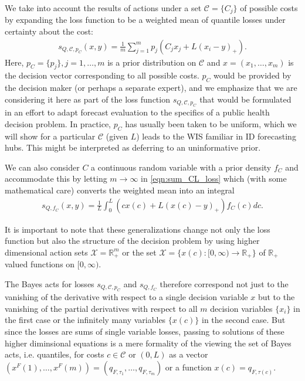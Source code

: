 \documentclass{article}
\begin{document}
We take into account the results of actions under a set $\mathcal{C} = \{C_j\}$ of possible costs by expanding the loss function to be a weighted mean of quantile losses under certainty about the cost:
\begin{align}
s_{Q,\mathcal{C}, p_C}(x,y) = \frac{1}{m}\sum_{j=1}^{m}p_j(C_j x_j + L(x_i - y)_+). \label{eqn:sum_CL_loss}
\end{align}
Here, $p_C = \{p_j\}, j = 1,\ldots,m$ is a prior distribution on $\mathcal{C}$ and $x = (x_1,\ldots,x_m)$ is the decision vector corresponding to all possible costs.  $p_C$ would be provided by the decision maker (or perhaps a separate expert), and we emphasize that we are considering it here as part of the loss function $s_{Q,\mathcal{C}, p_C}$ that would be formulated in an effort to adapt forecast evaluation to the specifics of a public health decision problem. In practice, $p_C$ has usually been taken to be uniform, which we will show for a particular $\mathcal{C}$ (given $L$) leads to the WIS familiar in ID forecasting hubs. This might be interpreted as deferring to an uninformative prior. 

We can also consider $C$ a continuous random variable with a prior density $f_C$ and accommodate this by letting $m \to \infty$ in \eqref{eqn:sum_CL_loss} 
which (with some mathematical care) converts the weighted mean into an integral
\begin{align}
s_{Q,f_C}(x,y) = \frac{1}{L}\int_{0}^{L} (cx(c) + L(x(c) - y)_+) f_C(c)dc{}. \label{eqn:CRPS_loss}
\end{align}

It is important to note that these generalizations change not only the loss function but also the structure of the decision problem by using higher dimensional action sets $\mathcal{X}= \mathbb{R}_+^m$ or the set $\mathcal{X} = \{x(c):[0,\infty) \to \mathbb{R}_+\}$ of $\mathbb{R}_+$ valued functions on $[0,\infty)$.

The Bayes acts for losses $s_{Q,\mathcal{C}, p_C}$ and $s_{Q,f_C}$ therefore correspond not just to the vanishing of the derivative with respect to a single
decision variable $x$ but to the vanishing of the partial derivatives with respect to all $m$ decision variables $\{x_i\}$ in the first case or the infinitely many variables $\{x(c)\}$ in the second case.  But since the losses are sums of single variable losses, passing to solutions of these higher diminsional equations is a mere formality of the viewing the set of Bayes acts, i.e. quantiles, for costs $c \in \mathcal{C}$ or $(0,L)$ as a vector 
$(x^F(1),\ldots,x^F(m))=(q_{F,\tau_1},\ldots,q_{F,\tau_m})$ or a function $x(c) = q_{F,\tau(c)}$.
\end{document}
